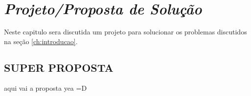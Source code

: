 \chapter{\textit{Projeto/Proposta de Solução}}
	\label{ch:proposta}
Neste capitulo sera discutida um projeto para solucionar os problemas discutidos na seção \ref{ch:introducao}.  

\section{SUPER PROPOSTA}
aqui vai a proposta yea =D